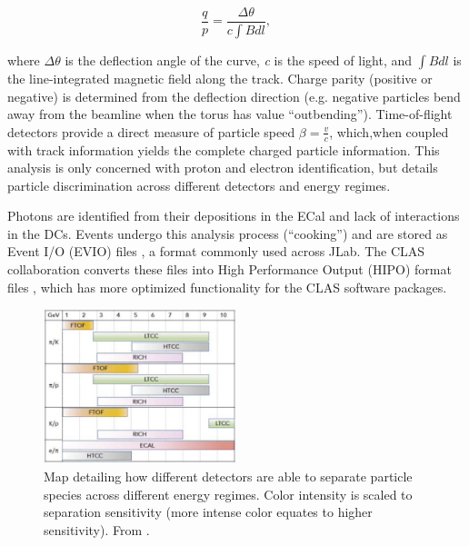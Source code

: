     \begin{equation}\label{eq:particle_track}
        \frac{q}{p} = \frac{\Delta \theta}{c \int B dl},
    \end{equation}

    where $\Delta \theta$ is the deflection angle of the curve, \textit{c} is the speed of light, and $\int B dl$ is the line-integrated magnetic field along the track. Charge parity (positive or negative) is determined from the deflection direction (e.g. negative particles bend away from the beamline when the torus has value ``outbending''). Time-of-flight detectors provide a direct measure of particle speed $\beta = \frac{v}{c}$, which,when coupled with track information yields the complete charged particle information. This analysis is only concerned with proton and electron identification, but  details particle discrimination across different detectors and energy regimes.
    
    Photons are identified from their depositions in the ECal and lack of interactions in the DCs. Events undergo this analysis process (``cooking'') and are stored as Event I/O (EVIO) files \parencite{Wolin2007EVIOPackage}, a format commonly used across JLab. The CLAS collaboration converts these files into High Performance Output (HIPO) format files \parencite{Ziegler2020TheReconstruction}, which has more optimized functionality for the CLAS software packages. 

    \begin{figure}[H]
        \centering
         \includegraphics[width=0.5\textwidth]{Chapters/Ch2-Experiment/recon_pid/pid_figs/pid-clas12-new.png}
        \caption[Particle Separation by Detector]{Map detailing how different detectors are able to separate particle species across different energy regimes. Color intensity is scaled to separation sensitivity (more intense color equates to higher sensitivity). From \parencite{Burkert2020TheLaboratory}.}
        \label{fig:clas12-pid-overview}
    \end{figure}


